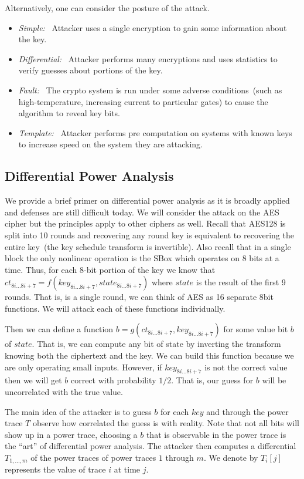 \documentclass{article}
\begin{document}
Alternatively, one can consider the posture of the attack.
\begin{itemize}
\item \emph{Simple:}~\cite{kocherDPA} Attacker uses a single encryption to gain some information about the key.
\item \emph{Differential:}~\cite{kocherDPA} Attacker performs many encryptions and uses statistics to verify guesses about portions of the key.
\item \emph{Fault:}~\cite{bihamShamirFault} The crypto system is run under some adverse conditions~(such as high-temperature, increasing current to particular gates) to cause the algorithm to reveal key bits.
\item \emph{Template:}~\cite{chariTemplate} Attacker performs pre computation on systems with known keys to increase speed on the system they are attacking.
\end{itemize}

\subsection{Differential Power Analysis}
We provide a brief primer on differential power analysis as it is broadly applied and defenses are still difficult today.  We will consider the attack on the AES cipher but the principles apply to other ciphers as well.  Recall that AES128 is split into 10 rounds and recovering any round key is equivalent to recovering the entire key~(the key schedule transform is invertible).  Also recall that in a single block the only nonlinear operation is the SBox which operates on 8 bits at a time.  Thus, for each 8-bit portion of the key we know that $ct_{8i...8i+7} = f(key_{8i...8i+7}, state_{8i...8i+7})$ where $state$ is the result of the first 9 rounds.  That is, is a single round, we can think of AES as 16 separate 8bit functions.  We will attack each of these functions individually.

Then we can define a function $b = g(ct_{8i...8i+7}, key_{8i...8i+7})$ for some value  bit $b$ of $state$.    That is, we can compute any bit of state by inverting the transform knowing both the ciphertext and the key.  We can build this function because we are only operating small inputs.  However, if $key_{8i...8i+7}$ is not the correct value then we will get $b$ correct with probability $1/2$.  That is, our guess for $b$ will be uncorrelated with the true value.  

The main idea of the attacker is to guess $b$ for each $key$ and through the power trace $T$ observe how correlated the guess is with reality.  Note that not all bits will show up in a power trace, choosing a $b$ that is observable in the power trace is the ``art'' of differential power analysis.  The attacker then computes a differential $T_{1,...,m}$ of the power traces of power traces $1$ through $m$.  We denote by $T_i[j]$ represents the value of trace $i$ at time $j$.
\end{document}
